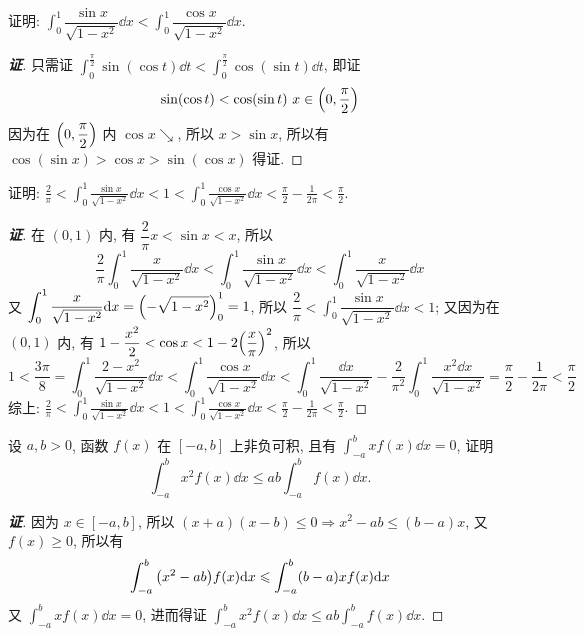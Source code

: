 \begin{example}
    证明: $\displaystyle\int_{0}^{1}\dfrac{\sin x}{\sqrt{1-x^2}}\dd x<\int_{0}^{1}\dfrac{\cos x}{\sqrt{1-x^2}}\dd x.$
\end{example}
\begin{proof}[{\songti \textbf{证}}]
    只需证 $\displaystyle\int_{0}^{\frac{\pi}{2}}\sin(\cos t)\dd t<\int_{0}^{\frac{\pi}{2}}\cos(\sin t)\dd t$,
    即证 $$\sin(\cos t)<\cos(\sin t)~  x\in\qty(0,\dfrac{\pi}{2})$$
    因为在 $\qty(0,\dfrac{\pi}{2})$ 内 $\cos x\searrow$, 所以 $x>\sin x$, 所以有
    $\cos(\sin x)>\cos x>\sin(\cos x)$
    得证.
\end{proof}
\begin{inference}
    证明: $\displaystyle \frac{2}{\pi} < \int_{0}^{1} \frac{\sin x}{\sqrt{1-x^{2}}} \dd  x<1<\int_{0}^{1} \frac{\cos x}{\sqrt{1-x^{2}}} \dd  x<\frac{\pi}{2}-\frac{1}{2 \pi}<\frac{\pi}{2}.$
\end{inference}
\begin{proof}[{\songti \textbf{证}}]
    在 $(0,1)$ 内, 有 $\dfrac{2}{\pi}x<\sin x< x$, 所以
    $$\dfrac{2}{\pi}\int_{0}^{1}\dfrac{x}{\sqrt{1-x^2}}\dd x<\int_{0}^{1}\dfrac{\sin x}{\sqrt{1-x^2}}\dd x<\int_{0}^{1}\dfrac{x}{\sqrt{1-x^2}}\dd x$$
    又 $\displaystyle\int_{0}^{1}\dfrac{x}{\sqrt{1-x^2}}\dd x=\qty(-\sqrt{1-x^2})_0^1=1$, 所以 $\displaystyle \dfrac{2}{\pi}<\int_{0}^{1}\dfrac{\sin x}{\sqrt{1-x^2}}\dd x<1$;
    又因为在 $(0,1)$ 内, 有 $1-\dfrac{x^2}{2}<\cos x<1-2\qty(\dfrac{x}{\pi})^2$, 所以
    $$1<\dfrac{3\pi}{8}=\int_{0}^{1}\dfrac{2-x^2}{\sqrt{1-x^2}}\dd x<\int_{0}^{1}\dfrac{\cos x}{\sqrt{1-x^2}}\dd x<\int_{0}^{1}\dfrac{\dd x}{\sqrt{1-x^2}}-\dfrac{2}{\pi^2}\int_{0}^{1}\dfrac{x^2\dd x}{\sqrt{1-x^2}}=\dfrac{\pi}{2}-\dfrac{1}{2\pi}<\dfrac{\pi}{2}$$
    综上: $\displaystyle \frac{2}{\pi} < \int_{0}^{1} \frac{\sin x}{\sqrt{1-x^{2}}} \dd  x<1<\int_{0}^{1} \frac{\cos x}{\sqrt{1-x^{2}}} \dd  x<\frac{\pi}{2}-\frac{1}{2 \pi}<\frac{\pi}{2}.$
\end{proof}

\begin{example}
    设 $a,b>0$, 函数 $f(x)$ 在 $[-a,b]$ 上非负可积, 且有 $\displaystyle\int_{-a}^{b}xf(x)\dd x=0$, 证明
    $$\int_{-a}^{b}x^2f(x)\dd x\leqslant ab\int_{-a}^{b}f(x)\dd x.$$
\end{example}
\begin{proof}[{\songti \textbf{证}}]
    因为 $x\in[-a,b]$, 所以 $(x+a)(x-b)\leqslant 0\Rightarrow x^2-ab\leqslant (b-a)x$, 又 $f(x)\geqslant 0$, 所以有
    $$\int_{-a}^{b}\qty(x^2-ab)f(x)\dd x\leqslant \int_{-a}^{b}(b-a)xf(x)\dd x$$
    又 $\displaystyle\int_{-a}^{b}xf(x)\dd x=0$, 进而得证 $\displaystyle\int_{-a}^{b}x^2f(x)\dd x\leqslant ab\int_{-a}^{b}f(x)\dd x.$
\end{proof}

